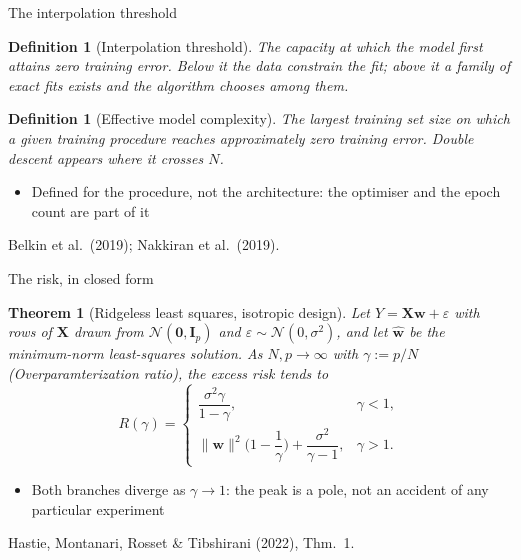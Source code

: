 \documentclass[aspectratio=169, 11pt]{beamer}
\newtheorem{defx}[theorem]{Definition}
\newtheorem{thmx}[theorem]{Theorem}
\newcommand{\srcline}[1]{%
  \par\vspace{0.25em}%
  {\scriptsize\color{mcMuted}\hfill #1\par}}
\newcommand{\src}[3]{}      %
\begin{document}
\begin{frame}{The interpolation threshold}
  \src{belkin2019}{figure}{1}
  \src{belkin2019}{section}{1}
  \src{nakkiran2020}{section}{2}
  \src{bishop2024}{section}{9.3.2}
  \vspace{-0.1em}
  \begin{defx}[Interpolation threshold]\label{th:thresh}
    \small
    The capacity at which the model first attains zero training error.
    Below it the data constrain the fit; above it a family of exact fits
    exists and the algorithm chooses among them.
  \end{defx}
  \vspace{0.2em}
  \begin{defx}[Effective model complexity]\label{th:emc}
    \small
    The largest training set size on which a given training procedure
    reaches approximately zero training error. Double descent appears
    where it crosses $N$.
  \end{defx}
  \vspace{0.15em}
  \begin{itemize}\itemsep0.25em
    \item Defined for the \alert{procedure}, not the architecture: the
          optimiser and the epoch count are part of it
  \end{itemize}
  \srcline{Belkin et al.\ (2019); Nakkiran et al.\ (2019).}
\end{frame}

\begin{frame}{The risk, in closed form}
  \src{hastie2022}{equation}{8}
  \src{hastie2022}{section}{3.2}
  \vspace{-0.25em}
  \begin{thmx}[Ridgeless least squares, isotropic design]\label{th:ridgeless}
    \small
    Let $Y = \mathbf{X}\mathbf{w} + \varepsilon$ with rows of $\mathbf{X}$ drawn from
    $\mathcal{N}(\mathbf{0}, \mathbf{I}_p)$ and $\varepsilon \sim \mathcal{N}(0, \sigma^2)$,
    and let $\hat{\mathbf{w}}$ be the minimum-norm least-squares solution.
    As $N, p \to \infty$ with $ \gamma:=p/N$ (Overparamterization ratio), the excess risk tends to
    \[
      R(\gamma) =
      \begin{cases}
        \dfrac{\sigma^2 \gamma}{1 - \gamma}, & \gamma < 1,\\[0.9em]
        \|\mathbf{w}\|^2\Big(1 - \dfrac{1}{\gamma}\Big)
          + \dfrac{\sigma^2}{\gamma - 1}, & \gamma > 1 .
      \end{cases}
    \]
  \end{thmx}
  \vspace{0.25em}
  \begin{itemize}\itemsep0.25em
    \item Both branches diverge as $\gamma \to 1$: the peak is a pole,
          not an accident of any particular experiment
  \end{itemize}
  \srcline{Hastie, Montanari, Rosset \& Tibshirani (2022), Thm.~1.}
\end{frame}
\end{document}
